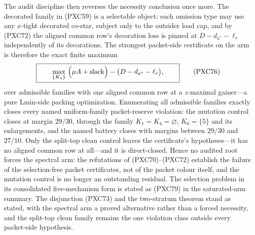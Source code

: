 \documentclass[11pt]{article}
\begin{document}
The audit discipline then reverses the necessity conclusion once more.
The decorated family in (PXC59) is a selectable object: each omission
type may use any $x$-tight decorated co-star, subject only to the
outsider load cap, and by (PXC72) the aligned common row's decoration
loss is pinned at $D-d_{a^*}-\ell_r$ independently of its decorations.
The strongest packet-side certificate on the arm is therefore the exact
finite maximum
\[
 \boxed{\qquad
 \max_{\{K_a\}}\ \Bigl(\mu A+{\rm slack}\Bigr)
 -\bigl(D-d_{a^*}-\ell_r\bigr),
 \qquad}                                             \tag{PXC76}
\]
over admissible families with one aligned common row at a $z$-maximal
gainer---a pure Lmin-side packing optimization.  Enumerating all
admissible families exactly closes every named uniform-family
packet-reserve violation: the mutation control closes at margin $29/30$,
through the family $K_1=K_4=\varnothing$, $K_6=\{5\}$ and its
enlargements, and the named battery closes with margins between $29/30$
and $27/10$.  Only the split-top clean control leaves the certificate's
hypotheses---it has no aligned common row at all---and it is
direct-closed.  Hence no audited root forces the spectral arm: the
refutations of (PXC70)--(PXC72) establish the failure of the
selection-free packet certificates, not of the packet colour itself, and
the mutation control is no longer an outstanding residual.  The
selection problem in its consolidated five-mechanism form is stated as
(PXC79) in the saturated-arm summary.  The disjunction (PXC73) and the two-stratum
theorem stand as stated, with the spectral arm a proved alternative
rather than a forced necessity, and the split-top clean family remains
the one violation class outside every packet-side hypothesis.
\end{document}
